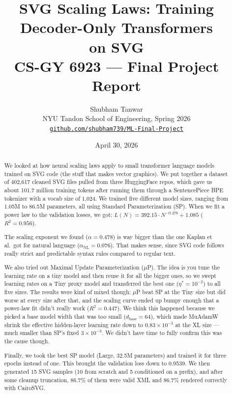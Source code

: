 \documentclass[10pt,letterpaper]{article}
\title{\textbf{SVG Scaling Laws: Training Decoder-Only Transformers\\
on SVG}\\[4pt]
\large CS-GY 6923 — Final Project Report}
\author{Shubham Tanwar\\
NYU Tandon School of Engineering, Spring 2026\\
\texttt{\href{https://github.com/shubham739/ML-Final-Project}{github.com/shubham739/ML-Final-Project}}}
\date{April 30, 2026}
\begin{document}
\maketitle
\thispagestyle{empty}

\begin{abstract}
We looked at how neural scaling laws apply to small transformer language models trained on SVG code (the stuff that makes vector graphics). We put together a dataset of 402,617 cleaned SVG files pulled from three HuggingFace repos, which gave us about 101.7 million training tokens after running them through a SentencePiece BPE tokenizer with a vocab size of 1,024. We trained five different model sizes, ranging from 1.05M to 86.5M parameters, all using Standard Parameterization (SP). When we fit a power law to the validation losses, we got:
$L(N) = 392.15 \cdot N^{-0.478} + 1.085$ ($R^2 = 0.956$).

The scaling exponent we found ($\alpha = 0.478$) is way bigger than the one Kaplan et al.\ got for natural language ($\alpha_\text{NL} = 0.076$). That makes sense, since SVG code follows really strict and predictable syntax rules compared to regular text.

We also tried out Maximal Update Parameterization ($\mu$P). The idea is you tune the learning rate on a tiny model and then reuse it for all the bigger ones, so we swept learning rates on a Tiny proxy model and transferred the best one ($\eta^* = 10^{-2}$) to all five sizes. The results were kind of mixed though: $\mu$P beat SP at the Tiny size but did worse at every size after that, and the scaling curve ended up bumpy enough that a power-law fit didn't really work ($R^2 = 0.447$). We think this happened because we picked a base model width that was too small ($d_\text{base} = 64$), which made MuAdamW shrink the effective hidden-layer learning rate down to $0.83 \times 10^{-3}$ at the XL size — much smaller than SP's fixed $3 \times 10^{-3}$. We didn't have time to fully confirm this was the cause though.

Finally, we took the best SP model (Large, 32.5M parameters) and trained it for three epochs instead of one. This brought the validation loss down to 0.9539. We then generated 15 SVG samples (10 from scratch and 5 conditioned on a prefix), and after some cleanup truncation, 86.7\% of them were valid XML and 86.7\% rendered correctly with CairoSVG.
\end{abstract}
\end{document}
